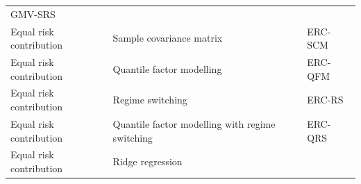 \documentclass[
]{article}
\begin{document}
\begin{longtable}[]{@{}lll@{}}
\begin{minipage}[t]{0.14\columnwidth}
GMV-SRS\strut
\end{minipage}\tabularnewline
\begin{minipage}[t]{0.27\columnwidth}\raggedright
Equal risk contribution\strut
\end{minipage} & \begin{minipage}[t]{0.50\columnwidth}\raggedright
Sample covariance matrix\strut
\end{minipage} & \begin{minipage}[t]{0.14\columnwidth}\raggedright
ERC-SCM\strut
\end{minipage}\tabularnewline
\begin{minipage}[t]{0.27\columnwidth}\raggedright
Equal risk contribution\strut
\end{minipage} & \begin{minipage}[t]{0.50\columnwidth}\raggedright
Quantile factor modelling\strut
\end{minipage} & \begin{minipage}[t]{0.14\columnwidth}\raggedright
ERC-QFM\strut
\end{minipage}\tabularnewline
\begin{minipage}[t]{0.27\columnwidth}\raggedright
Equal risk contribution\strut
\end{minipage} & \begin{minipage}[t]{0.50\columnwidth}\raggedright
Regime switching\strut
\end{minipage} & \begin{minipage}[t]{0.14\columnwidth}\raggedright
ERC-RS\strut
\end{minipage}\tabularnewline
\begin{minipage}[t]{0.27\columnwidth}\raggedright
Equal risk contribution\strut
\end{minipage} & \begin{minipage}[t]{0.50\columnwidth}\raggedright
Quantile factor modelling with regime switching\strut
\end{minipage} & \begin{minipage}[t]{0.14\columnwidth}\raggedright
ERC-QRS\strut
\end{minipage}\tabularnewline
\begin{minipage}[t]{0.27\columnwidth}\raggedright
Equal risk contribution\strut
\end{minipage} & \begin{minipage}[t]{0.50\columnwidth}\raggedright
Ridge regression\strut
\end{minipage} & \begin{minipage}[t]{0.14\columnwidth}\raggedright

\end{minipage}
\end{longtable}
\end{document}

